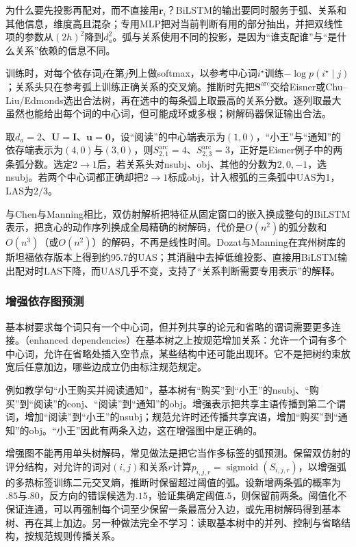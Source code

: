 为什么要先投影再配对，而不直接用$\bm r_i$？BiLSTM的输出要同时服务于弧、关系和其他信息，维度高且混杂；专用MLP把对当前判断有用的部分抽出，并把双线性项的参数从$(2h)^2$降到$d_a^2$。弧与关系使用不同的投影，是因为“谁支配谁”与“是什么关系”依赖的信息不同。

训练时，对每个依存词$j$在第$j$列上做softmax，以参考中心词$i^\star$训练$-\log p(i^\star\mid j)$；关系头只在参考弧上训练正确关系的交叉熵。推断时先把$\bm S^{\mathrm{arc}}$交给Eisner或Chu--Liu/Edmonds选出合法树，再在选中的每条弧上取最高的关系分数。逐列取最大虽然也能给出每个词的中心词，但可能成环或多根；树解码器保证输出合法。

取$d_a=2$、$\bm U=\bm I$、$\bm u=\bm 0$，设“阅读”的中心端表示为$(1,0)$，“小王”与“通知”的依存端表示为$(4,0)$与$(3,0)$，则$S^{\mathrm{arc}}_{2,1}=4$、$S^{\mathrm{arc}}_{2,3}=3$，正好是Eisner例子中的两条弧分数。选定$2\to1$后，若关系头对nsubj、obj、其他的分数为$2,0,-1$，选nsubj。若两个中心词都正确却把$2\to1$标成obj，计入根弧的三条弧中UAS为1，LAS为$2/3$。

与Chen与Manning相比，双仿射解析把特征从固定窗口的嵌入换成整句的BiLSTM表示，把贪心的动作序列换成全局精确的树解码，代价是$O(n^2)$的弧分数和$O(n^3)$（或$O(n^2)$）的解码，不再是线性时间。Dozat与Manning在宾州树库的斯坦福依存版本上得到约95.7的UAS；其消融中去掉低维投影、直接用BiLSTM输出配对时LAS下降，而UAS几乎不变，支持了“关系判断需要专用表示”的解释。

\subsubsection{增强依存图预测}
\label{sec:nlp-analysis-enhanced}

基本树要求每个词只有一个中心词，但并列共享的论元和省略的谓词需要更多连接。（enhanced dependencies）在基本树之上按规范增加关系：允许一个词有多个中心词，允许在省略处插入空节点，某些结构中还可能出现环。它不是把树约束放宽后任意加边，哪些边成立仍由标注规范规定。

例如教学句“小王购买并阅读通知”，基本树有“购买”到“小王”的nsubj、“购买”到“阅读”的conj、“阅读”到“通知”的obj。增强表示把共享主语传播到第二个谓词，增加“阅读”到“小王”的nsubj；规范允许时还传播共享宾语，增加“购买”到“通知”的obj。“小王”因此有两条入边，这在增强图中是正确的。

增强图不能再用单头树解码，常见做法是把它当作多标签的弧预测。保留双仿射的评分结构，对允许的词对$(i,j)$和关系$r$计算$p_{i,j,r}=\operatorname{sigmoid}(S_{i,j,r})$，以增强弧的多热标签训练二元交叉熵，推断时保留超过阈值的弧。设新增两条弧的概率为$.85$与$.80$，反方向的错误候选为$.15$，验证集确定阈值$.5$，则保留前两条。阈值化不保证连通，可以再强制每个词至少保留一条最高分入边，或先用树解码得到基本树、再在其上加边。另一种做法完全不学习：读取基本树中的并列、控制与省略结构，按规范规则传播关系。

